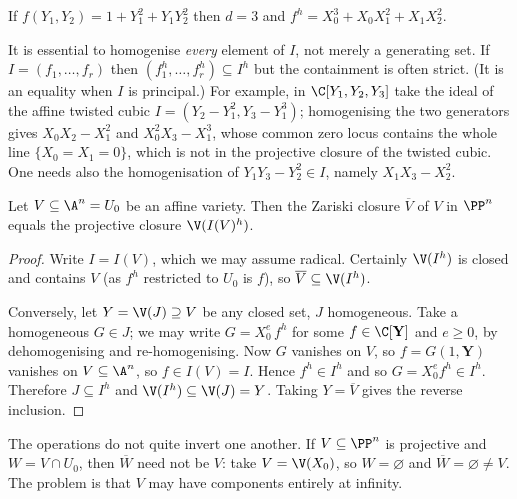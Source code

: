 \begin{example}
	If $f(Y_1,Y_2) = 1 + Y_1^2 + Y_1Y_2^2$ then $d = 3$ and $f^h = X_0^3 + X_0X_1^2 + X_1X_2^2$.
\end{example}

\begin{remark}
	It is essential to homogenise \emph{every} element of $I$, not merely a generating set. If $I = (f_1,\dots,f_r)$ then $(f_1^h,\dots,f_r^h) \subseteq I^h$ but the containment is often strict. (It is an equality when $I$ is principal.) For example, in $\C[Y_1,Y_2,Y_3]$ take the ideal of the affine twisted cubic $I = (Y_2 - Y_1^2, Y_3 - Y_1^3)$; homogenising the two generators gives $X_0X_2 - X_1^2$ and $X_0^2X_3 - X_1^3$, whose common zero locus contains the whole line $\{X_0 = X_1 = 0\}$, which is not in the projective closure of the twisted cubic. One needs also the homogenisation of $Y_1Y_3 - Y_2^2 \in I$, namely $X_1X_3 - X_2^2$.
\end{remark}

\begin{proposition}
	Let $V \subseteq \A^n = U_0$ be an affine variety. Then the Zariski closure $\overline V$ of $V$ in $\PP^n$ equals the projective closure $\V(I(V)^h)$.
\end{proposition}

\begin{proof}
	Write $I = I(V)$, which we may assume radical. Certainly $\V(I^h)$ is closed and contains $V$ (as $f^h$ restricted to $U_0$ is $f$), so $\overline V \subseteq \V(I^h)$.

	Conversely, let $Y = \V(J) \supseteq V$ be any closed set, $J$ homogeneous. Take a homogeneous $G \in J$; we may write $G = X_0^e\, f^h$ for some $f \in \C[\mathbf Y]$ and $e \geq 0$, by dehomogenising and re-homogenising. Now $G$ vanishes on $V$, so $f = G(1,\mathbf Y)$ vanishes on $V \subseteq \A^n$, so $f \in I(V) = I$. Hence $f^h \in I^h$ and so $G = X_0^e f^h \in I^h$. Therefore $J \subseteq I^h$ and $\V(I^h) \subseteq \V(J) = Y$. Taking $Y = \overline V$ gives the reverse inclusion.
\end{proof}

\begin{remark}
	The operations do not quite invert one another. If $V \subseteq \PP^n$ is projective and $W = V \cap U_0$, then $\overline W$ need not be $V$: take $V = \V(X_0)$, so $W = \varnothing$ and $\overline W = \varnothing \neq V$. The problem is that $V$ may have components entirely at infinity.
\end{remark}

